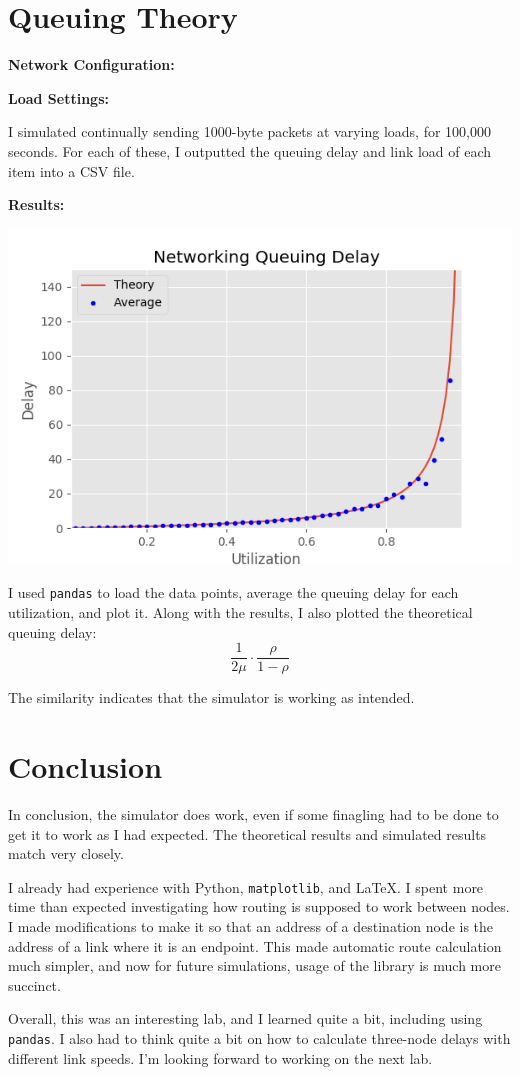 \documentclass[fleqn,11pt]{article}
\begin{document}
\section{Queuing Theory}
\textbf{Network Configuration:}


\noindent
\textbf{Load Settings:}

I simulated continually sending 1000-byte packets at varying loads, for 100,000 seconds.
For each of these, I outputted the queuing delay and link load of each item into a CSV file.

\noindent
\textbf{Results:}
\begin{center}
\includegraphics{graphs/queueing}
\end{center}

I used \texttt{pandas} to load the data points, average the queuing delay for each utilization, and plot it.
Along with the results, I also plotted the theoretical queuing delay:
\[
\frac{1}{2 \mu} \cdot \frac{\rho}{1-\rho}
\]

The similarity indicates that the simulator is working as intended.

\section{Conclusion}
In conclusion, the simulator does work, even if some finagling had to be done to get it to work as I had expected.
The theoretical results and simulated results match very closely.

I already had experience with Python, \texttt{matplotlib}, and \LaTeX.
I spent more time than expected investigating how routing is supposed to work between nodes.
I made modifications to make it so that an address of a destination node is the address of a link where it is an endpoint.
This made automatic route calculation much simpler, and now for future simulations, usage of the library is much more succinct.

Overall, this was an interesting lab, and I learned quite a bit, including using \texttt{pandas}. 
I also had to think quite a bit on how to calculate three-node delays with different link speeds.
I'm looking forward to working on the next lab.
\end{document}

